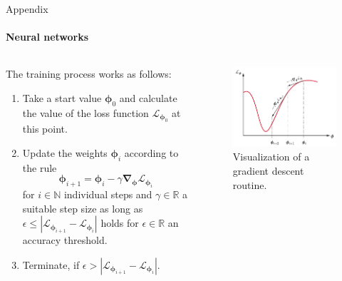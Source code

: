 \documentclass{beamer}
\newcommand\vect[1]{\ensuremath{\bm{#1}}}
\begin{document}
\begin{frame}[allowframebreaks]{Appendix}
	\framesubtitle{Neural networks}
	
	\begin{columns}
		\begin{column}{0.6\textwidth}
			The training process works as follows:
			\begin{enumerate}
				\item Take a start value $\vect{\phi}_0$ and calculate the value of the loss function $\mathcal{L}_{\vect{\phi}_0}$ at this point.
				\item Update the weights $\vect{\phi}_{i}$ according to the rule \begin{equation}
					\vect{\phi}_{i+1} = \vect{\phi}_{i} - \gamma \vect{\nabla}_{\vect{\phi}}\mathcal{L}_{\vect{\phi}_i}
				\end{equation} for $i \in \mathbb{N}$ individual steps and $\gamma \in \mathbb{R}$ a suitable step size as long as $\epsilon \leq |\mathcal{L}_{\vect{\phi}_{i+1}}-\mathcal{L}_{\vect{\phi}_{i}}|$ holds for $\epsilon \in \mathbb{R}$ an accuracy threshold.
				\item Terminate, if $\epsilon > |\mathcal{L}_{\vect{\phi}_{i+1}}-\mathcal{L}_{\vect{\phi}_{i}}|$.
			\end{enumerate}
		\end{column}
		\begin{column}{0.4\textwidth}
			\begin{figure}[h]
				\centering
				\includegraphics[width=\textwidth]{figures/thesis/gradientdescent.pdf}
				\caption{Visualization of a gradient descent routine.}
				\label{fig:gradientdescent}
			\end{figure}
		\end{column}
	\end{columns}
	
\end{frame}
\end{document}
